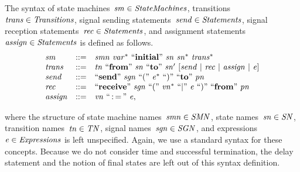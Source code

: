 The syntax of state machines~$\it{sm} \in \it StateMachines$, transitions~$\it{trans} \in \it Transitions$, signal sending statements~$\it{send} \in \it Statements$, signal reception statements~$\it{rec} \in \it Statements$, and assignment statements~$\it{assign} \in \it Statements$ is defined as follows.
%
\[
\begin{array}{lcl}
\it{sm} & ::= & \it{smn}~\it{var^*}~``\textbf{initial}"~\it{sn}~\it{sn^*}~\it{trans^*} \\
\it{trans} & ::= & \it{tn}~``\textbf{from}"~\it{sn}~``\textbf{to}"~\it{sn'}~[\it{send} ~ | ~ \it{rec} ~ | ~ \it{assign} ~ | ~ \it{e}] \\
\it{send} & ::= & ``\textbf{send}"~\it{sgn}~``("~\it{e^*}~``)"~``\textbf{to}"~\it{pn} \\
\it{rec} & ::= & ``\textbf{receive}"~\it{sgn}~``("~\it{vn^*}~``|"~\it{e}~``)"~``\textbf{from}"~\it{pn} \\
\it{assign} & ::= & \it{vn}~``\operatorname*{:=}"~\it{e},
\end{array}
\]

\noindent
where the structure of state machine names~$\it{smn} \in \it SMN$, state names~$\it{sn} \in \it SN$, transition names~$\it{tn} \in \it TN$, signal names~$\it{sgn} \in \it SGN$, and expressions~$\it{e} \in \it Expressions$ is left unspecified.
Again, we use a standard syntax for these concepts.
Because we do not consider time and successful termination, the delay statement and the notion of final states are left out of this syntax definition. 
